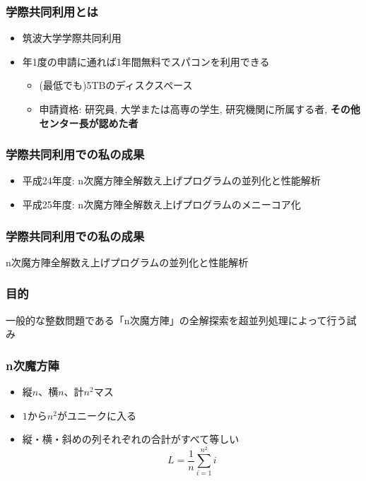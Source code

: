 \documentclass[dvipdfmx,20pt,notheorems,t]{beamer}
\begin{document}
\begin{frame}\frametitle{学際共同利用とは}
\begin{itemize}
\item 筑波大学学際共同利用
\item 年1度の申請に通れば1年間無料でスパコンを利用できる
\begin{itemize}
\item (最低でも)5TBのディスクスペース
\item 申請資格: {\tiny 研究員, 大学または高専の学生, 研究機関に所属する者,} \textbf{その他センター長が認めた者}
\end{itemize}
\end{itemize}
\end{frame}

\begin{frame}\frametitle{学際共同利用での私の成果}
\begin{itemize}
\item 平成24年度: n次魔方陣全解数え上げプログラムの並列化と性能解析
\item 平成25年度: n次魔方陣全解数え上げプログラムのメニーコア化
\end{itemize}
\end{frame}

\begin{frame}\frametitle{学際共同利用での私の成果}
\centering
\large
\vspace*{\fill}
n次魔方陣全解数え上げプログラムの並列化と性能解析
\vspace*{\fill}
\end{frame}

\begin{frame}\frametitle{目的}
一般的な整数問題である「n次魔方陣」の全解探索を超並列処理によって行う試み
\end{frame}

\begin{frame}\frametitle{n次魔方陣}
\begin{itemize}
\item 縦$n$、横$n$、計$n^2$マス
\item $1$から$n^2$がユニークに入る
\item 縦・横・斜めの列それぞれの合計がすべて等しい
\begin{equation}
L=\frac{1}{n}\sum_{i=1}^{n^2}i
\end{equation}
\end{itemize}
\end{frame}
\end{document}
